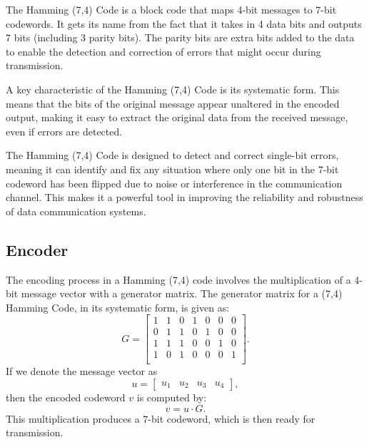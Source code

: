 \documentclass{article}
\begin{document}
The Hamming (7,4) Code is a block code that maps 4-bit messages to 7-bit codewords. It gets its name from the fact that it takes in 4 data bits and outputs 7 bits (including 3 parity bits). The parity bits are extra bits added to the data to enable the detection and correction of errors that might occur during transmission.

A key characteristic of the Hamming (7,4) Code is its systematic form. This means that the bits of the original message appear unaltered in the encoded output, making it easy to extract the original data from the received message, even if errors are detected. 

The Hamming (7,4) Code is designed to detect and correct single-bit errors, meaning it can identify and fix any situation where only one bit in the 7-bit codeword has been flipped due to noise or interference in the communication channel. This makes it a powerful tool in improving the reliability and robustness of data communication systems.



\subsection{Encoder}
The encoding process in a Hamming (7,4) code involves the multiplication of a 4-bit message vector with a generator matrix. The generator matrix for a (7,4) Hamming Code, in its systematic form, is given as:
\begin{equation*}
    G = 
        \begin{bmatrix}
        1 & 1 & 0 & 1 & 0 & 0 & 0 \\
        0 & 1 & 1 & 0 & 1 & 0 & 0 \\
        1 & 1 & 1 & 0 & 0 & 1 & 0 \\
        1 & 0 & 1 & 0 & 0 & 0 & 1 \\
        \end{bmatrix}.
\end{equation*}
If we denote the message vector as 
\begin{equation*}
    u =
        \begin{bmatrix}
        u_1 & u_2 & u_3 & u_4 
        \end{bmatrix},
\end{equation*}
then the encoded codeword $v$ is computed by:
\begin{equation*}
    v = u \cdot G .
\end{equation*}
This multiplication produces a 7-bit codeword, which is then ready for transmission.
\end{document}
